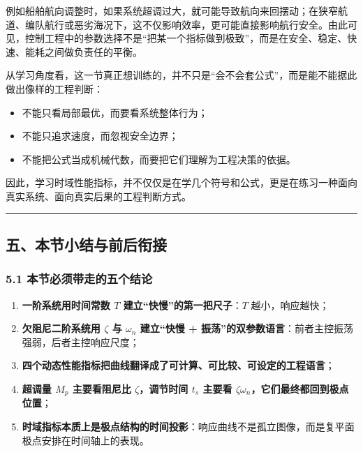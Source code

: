 \documentclass[
  11pt]{article}
\providecommand{\tightlist}{%
  \setlength{\itemsep}{0pt}\setlength{\parskip}{0pt}}
\begin{document}
例如船舶航向调整时，如果系统超调过大，就可能导致航向来回摆动；在狭窄航道、编队航行或恶劣海况下，这不仅影响效率，更可能直接影响航行安全。由此可见，控制工程中的参数选择不是``把某一个指标做到极致''，而是在安全、稳定、快速、能耗之间做负责任的平衡。

从学习角度看，这一节真正想训练的，并不只是``会不会套公式''，而是能不能据此做出像样的工程判断：

\begin{itemize}
\tightlist
\item
  不能只看局部最优，而要看系统整体行为；
\item
  不能只追求速度，而忽视安全边界；
\item
  不能把公式当成机械代数，而要把它们理解为工程决策的依据。
\end{itemize}

因此，学习时域性能指标，并不仅仅是在学几个符号和公式，更是在练习一种面向真实系统、面向真实后果的工程判断方式。

\begin{center}\rule{0.5\linewidth}{0.5pt}\end{center}

\subsection{五、本节小结与前后衔接}\label{ux4e94ux672cux8282ux5c0fux7ed3ux4e0eux524dux540eux8854ux63a5}

\subsubsection{5.1
本节必须带走的五个结论}\label{ux672cux8282ux5fc5ux987bux5e26ux8d70ux7684ux4e94ux4e2aux7ed3ux8bba}

\begin{enumerate}
\def\labelenumi{\arabic{enumi}.}
\tightlist
\item
  \textbf{一阶系统用时间常数 \(T\) 建立``快慢''的第一把尺子}：\(T\)
  越小，响应越快；
\item
  \textbf{欠阻尼二阶系统用 \(\zeta\) 与 \(\omega_n\) 建立``快慢 +
  振荡''的双参数语言}：前者主控振荡强弱，后者主控响应尺度；
\item
  \textbf{四个动态性能指标把曲线翻译成了可计算、可比较、可设定的工程语言}；
\item
  \textbf{超调量 \(M_p\) 主要看阻尼比 \(\zeta\)，调节时间 \(t_s\) 主要看
  \(\zeta\omega_n\)，它们最终都回到极点位置}；
\item
  \textbf{时域指标本质上是极点结构的时间投影}：响应曲线不是孤立图像，而是复平面极点安排在时间轴上的表现。
\end{enumerate}
\end{document}
